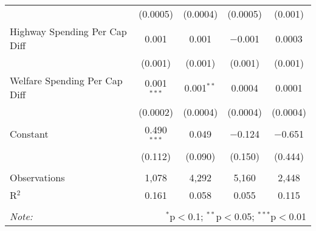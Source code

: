 \begin{table}[!htbp]
\begin{tabular}{@{\extracolsep{5pt}}lcccc}
  & (0.0005) & (0.0004) & (0.0005) & (0.001) \\ 
  Highway Spending Per Cap Diff & 0.001 & 0.001 & $-$0.001 & 0.0003 \\ 
  & (0.001) & (0.001) & (0.001) & (0.001) \\ 
  Welfare Spending Per Cap Diff & 0.001$^{***}$ & 0.001$^{**}$ & 0.0004 & 0.0001 \\ 
  & (0.0002) & (0.0004) & (0.0004) & (0.0004) \\ 
  Constant & 0.490$^{***}$ & 0.049 & $-$0.124 & $-$0.651 \\ 
  & (0.112) & (0.090) & (0.150) & (0.444) \\ 
 \hline \\[-1.8ex] 
Observations & 1,078 & 4,292 & 5,160 & 2,448 \\ 
R$^{2}$ & 0.161 & 0.058 & 0.055 & 0.115 \\ 
\hline 
\hline \\[-1.8ex] 
\textit{Note:}  & \multicolumn{4}{r}{$^{*}$p$<$0.1; $^{**}$p$<$0.05; $^{***}$p$<$0.01} \\ 
\end{tabular} 
\end{table} 

